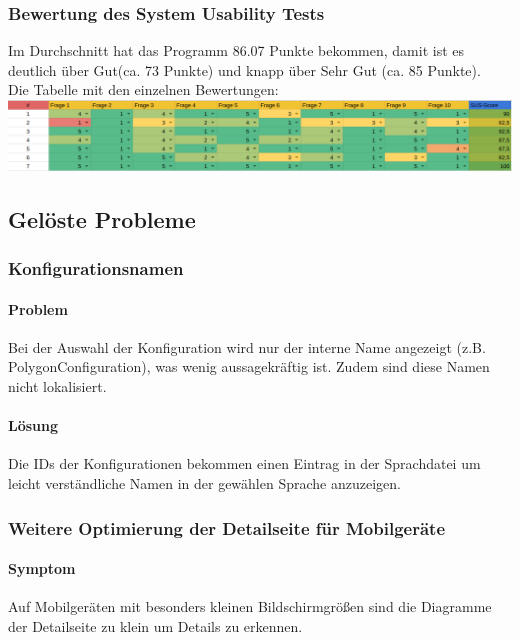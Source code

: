 \subsubsection{Bewertung des System Usability Tests}

Im Durchschnitt hat das Programm 86.07 Punkte bekommen, damit ist es deutlich über Gut(ca. 73 Punkte) und knapp über Sehr Gut (ca. 85 Punkte). 
\\Die Tabelle mit den einzelnen Bewertungen:
\\
\includegraphics[width=1\linewidth]{figures/SUSscore.png}\par\vspace{1cm}


\subsection{Gelöste Probleme}

\subsubsection{Konfigurationsnamen}
\paragraph{Problem}
Bei der Auswahl der Konfiguration wird nur der interne Name angezeigt (z.B. PolygonConfiguration),
was wenig aussagekräftig ist. Zudem sind diese Namen nicht lokalisiert.

\paragraph{Lösung}
Die IDs der Konfigurationen bekommen einen Eintrag in der Sprachdatei um leicht verständliche
Namen in der gewählen Sprache anzuzeigen.

\subsubsection{Weitere Optimierung der Detailseite für Mobilgeräte}
\paragraph{Symptom}
Auf Mobilgeräten mit besonders kleinen Bildschirmgrößen sind die Diagramme der Detailseite zu klein um Details zu erkennen.

